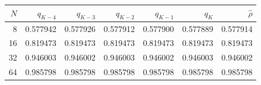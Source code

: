 \begin{tabular}{rrrrrrr}
\toprule
$N$ & $q_{K-4}$ & $q_{K-3}$ & $q_{K-2}$ & $q_{K-1}$ & $q_K$ & $\widehat\rho$ \\
\midrule
8 & 0.577942 & 0.577926 & 0.577912 & 0.577900 & 0.577889 & 0.577914 \\
16 & 0.819473 & 0.819473 & 0.819473 & 0.819473 & 0.819473 & 0.819473 \\
32 & 0.946003 & 0.946002 & 0.946003 & 0.946002 & 0.946003 & 0.946002 \\
64 & 0.985798 & 0.985798 & 0.985798 & 0.985798 & 0.985798 & 0.985798 \\
\bottomrule
\end{tabular}

